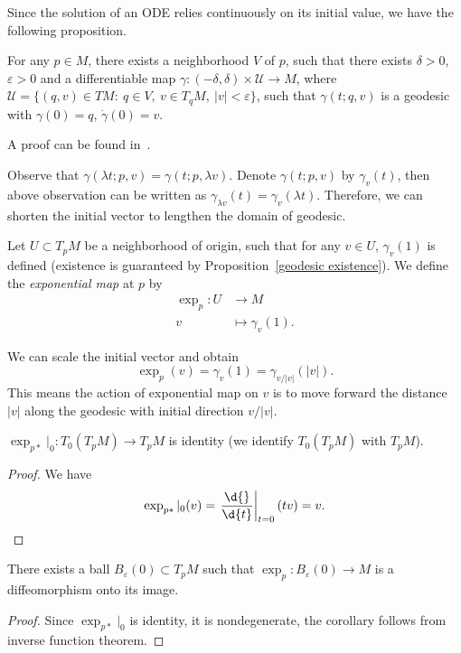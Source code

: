 Since the solution of an ODE relies continuously on its initial value, we have the following proposition.
\begin{prop}\label{geodesic existence}
    For any $p\in M$, there exists a neighborhood $V$ of $p$, such that there exists $\delta>0$, $\varepsilon>0$ and a differentiable map $\gamma:(-\delta,\delta)\times\mathscr{U}\to M$, where $\mathscr{U}=\{(q,v)\in TM:\ q\in V,\ v\in T_qM,\ |v|<\varepsilon\}$, such that $\gamma(t;q,v)$ is a geodesic with $\gamma(0)=q$, $\dot\gamma(0)=v$.
\end{prop}
A proof can be found in~\cite[Chapter 3, Lemma 1]{Wu}.

Observe that $\gamma(\lambda t;p,v)=\gamma(t;p,\lambda v)$.
Denote $\gamma(t;p,v)$ by $\gamma_v(t)$, then above observation can be written as $\gamma_{\lambda v}(t)=\gamma_v(\lambda t)$.
Therefore, we can shorten the initial vector to lengthen the domain of geodesic.

\begin{defn}
    Let $U\subset T_pM$ be a neighborhood of origin, such that for any $v\in U$, $\gamma_v(1)$ is defined (existence is guaranteed by Proposition~\ref{geodesic existence}).
    We define the \emph{exponential map} at $p$ by
    \begin{align*}
        \exp_p:U&\to M\\
        v&\mapsto \gamma_v(1).
    \end{align*}
\end{defn}

\begin{rem}
    We can scale the initial vector and obtain
    \[\exp_p(v)=\gamma_v(1)=\gamma_{v/|v|}(|v|).\]
    This means the action of exponential map on $v$ is to move forward the distance $|v|$ along the geodesic with initial direction $v/|v|$.
\end{rem}

\begin{prop}\label{exp at 0}
    $\exp_{p*}|_0:T_0(T_pM)\to T_pM$ is identity (we identify $T_0(T_pM)$ with $T_pM$).
\end{prop}
\begin{proof}
    We have
    \[\exp_{p*}|_0(v)=\left.\frac{\d{}}{\d{t}}\right|_{t=0}(tv)=v.\qedhere\]
\end{proof}

\begin{cor}
    There exists a ball $B_\varepsilon(0)\subset T_pM$ such that $\exp_p:B_\varepsilon(0)\to M$ is a diffeomorphism onto its image.
\end{cor}
\begin{proof}
    Since $\exp_{p*}|_0$ is identity, it is nondegenerate, the corollary follows from inverse function theorem.
\end{proof}


